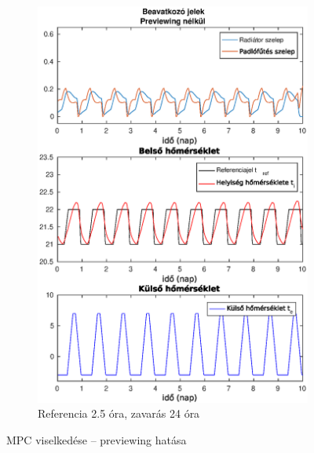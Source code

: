 \documentclass[14pt,handout]{beamer}
\begin{document}
\begin{frame}
\begin{figure}[H]
\begin{subfigure}[t]{0.45\textwidth}
		\includegraphics[trim=0 0 0 27, clip,width=\textwidth]{figures/onlab/compare/A_C_P5D48}
		\caption{\scriptsize Referencia 2.5 óra, zavarás 24 óra }
	\end{subfigure}
	\caption{MPC viselkedése -- previewing hatása}
	\label{fig:mpc-previeWeight2}
\end{figure}
\end{frame}
\end{document}
